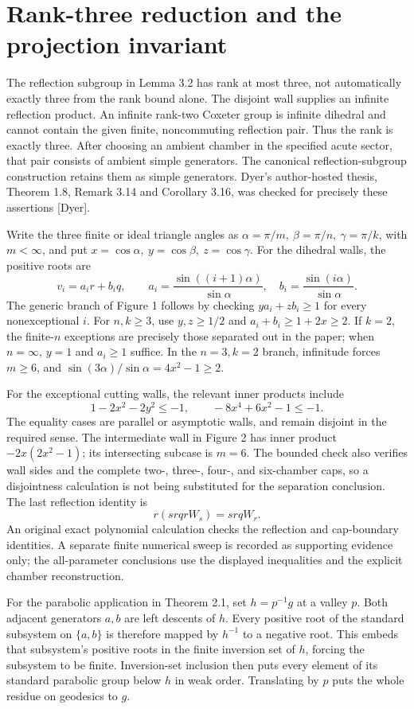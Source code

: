 \documentclass[10pt]{article}
\begin{document}
\section*{Rank-three reduction and the projection invariant}
The reflection subgroup in Lemma 3.2 has rank at most three, not automatically exactly three from the rank bound alone. The disjoint wall supplies an infinite reflection product. An infinite rank-two Coxeter group is infinite dihedral and cannot contain the given finite, noncommuting reflection pair. Thus the rank is exactly three. After choosing an ambient chamber in the specified acute sector, that pair consists of ambient simple generators. The canonical reflection-subgroup construction retains them as simple generators. Dyer’s author-hosted thesis, Theorem 1.8, Remark 3.14 and Corollary 3.16, was checked for precisely these assertions [Dyer].\par
Write the three finite or ideal triangle angles as \(\alpha=\pi/m,\ \beta=\pi/n,\ \gamma=\pi/k\), with \(m<\infty\), and put \(x=\cos\alpha,\ y=\cos\beta,\ z=\cos\gamma\). For the dihedral walls, the positive roots are \[v_i=a_i r+b_i q,\qquad
 a_i=\frac{\sin((i+1)\alpha)}{\sin\alpha},\quad
 b_i=\frac{\sin(i\alpha)}{\sin\alpha}.\] The generic branch of Figure 1 follows by checking \(y a_i+z b_i\ge1\) for every nonexceptional \(i\). For \(n,k\ge3\), use \(y,z\ge1/2\) and \(a_i+b_i\ge1+2x\ge2\). If \(k=2\), the finite-\(n\) exceptions are precisely those separated out in the paper; when \(n=\infty\), \(y=1\) and \(a_i\ge1\) suffice. In the \(n=3,k=2\) branch, infinitude forces \(m\ge6\), and \(\sin(3\alpha)/\sin\alpha=4x^2-1\ge2\).\par
For the exceptional cutting walls, the relevant inner products include \[1-2x^2-2y^2\le-1,\qquad
 -8x^4+6x^2-1\le-1.\] The equality cases are parallel or asymptotic walls, and remain disjoint in the required sense. The intermediate wall in Figure 2 has inner product \(-2x(2x^2-1)\); its intersecting subcase is \(m=6\). The bounded check also verifies wall sides and the complete two-, three-, four-, and six-chamber caps, so a disjointness calculation is not being substituted for the separation conclusion. The last reflection identity is \[r(srqrW_s)=srqW_r .\] An original exact polynomial calculation checks the reflection and cap-boundary identities. A separate finite numerical sweep is recorded as supporting evidence only; the all-parameter conclusions use the displayed inequalities and the explicit chamber reconstruction.\par
For the parabolic application in Theorem 2.1, set \(h=p^{-1}g\) at a valley \(p\). Both adjacent generators \(a,b\) are left descents of \(h\). Every positive root of the standard subsystem on \(\{a,b\}\) is therefore mapped by \(h^{-1}\) to a negative root. This embeds that subsystem’s positive roots in the finite inversion set of \(h\), forcing the subsystem to be finite. Inversion-set inclusion then puts every element of its standard parabolic group below \(h\) in weak order. Translating by \(p\) puts the whole residue on geodesics to \(g\).\par
\end{document}
